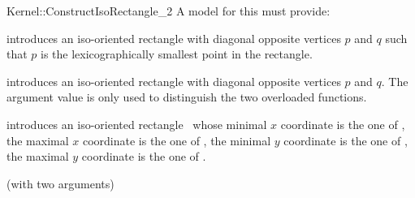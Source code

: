 \begin{ccRefFunctionObjectConcept}{Kernel::ConstructIsoRectangle_2}
A model for this must provide:


            {introduces an iso-oriented rectangle  with diagonal
             opposite vertices $p$ and $q$ such that $p$ is the
             lexicographically smallest point in the rectangle.}

            {introduces an iso-oriented rectangle with diagonal
             opposite vertices $p$ and $q$.  The  argument value is
             only used to distinguish the two overloaded functions.
             }

            {introduces an iso-oriented rectangle \ccVar\ whose
             minimal $x$ coordinate is the one of , the
             maximal $x$ coordinate is the one of , the
             minimal $y$ coordinate is the one of , the
             maximal $y$ coordinate is the one of .}

\ccRefines
{} (with two arguments)

\ccSeeAlso
{} \\

\end{ccRefFunctionObjectConcept}
